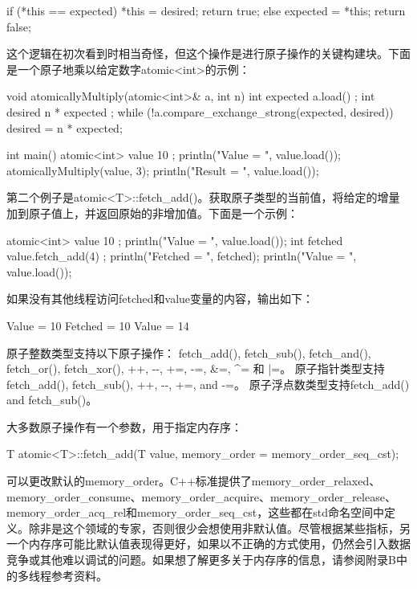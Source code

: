 \begin{cpp}
if (*this == expected) {
    *this = desired;
    return true;
} else {
    expected = *this;
    return false;
}
\end{cpp}

这个逻辑在初次看到时相当奇怪，但这个操作是进行原子操作的关键构建块。下面是一个原子地乘以给定数字atomic<int>的示例：

\begin{cpp}
void atomicallyMultiply(atomic<int>& a, int n)
{
    int expected { a.load() };
    int desired { n * expected };
    while (!a.compare_exchange_strong(expected, desired)) {
        desired = n * expected;
    }
}

int main()
{
    atomic<int> value { 10 };
    println("Value = {}", value.load());
    atomicallyMultiply(value, 3);
    println("Result = {}", value.load());
}
\end{cpp}

第二个例子是atomic<T>::fetch\_add()。获取原子类型的当前值，将给定的增量加到原子值上，并返回原始的非增加值。下面是一个示例：

\begin{cpp}
atomic<int> value { 10 };
println("Value = {}", value.load());
int fetched { value.fetch_add(4) };
println("Fetched = {}", fetched);
println("Value = {}", value.load());
\end{cpp}

如果没有其他线程访问fetched和value变量的内容，输出如下：

\begin{shell}
Value = 10
Fetched = 10
Value = 14
\end{shell}

原子整数类型支持以下原子操作： fetch\_add(), fetch\_sub(), fetch\_and(), fetch\_or(), fetch\_xor(), ++, -{}-, +=, -=, \&=, \^{}= 和 |=。 原子指针类型支持fetch\_add(), fetch\_sub(), ++, -{}-, +=, and -=。 原子浮点数类型支持fetch\_add() and fetch\_sub()。

大多数原子操作有一个参数，用于指定内存序：

\begin{cpp}
T atomic<T>::fetch_add(T value, memory_order = memory_order_seq_cst);
\end{cpp}

可以更改默认的memory\_order。C++标准提供了memory\_order\_relaxed、memory\_order\_consume、memory\_order\_acquire、memory\_order\_release、memory\_order\_acq\_rel和memory\_order\_seq\_cst，这些都在std命名空间中定义。除非是这个领域的专家，否则很少会想使用非默认值。尽管根据某些指标，另一个内存序可能比默认值表现得更好，如果以不正确的方式使用，仍然会引入数据竞争或其他难以调试的问题。如果想了解更多关于内存序的信息，请参阅附录B中的多线程参考资料。


